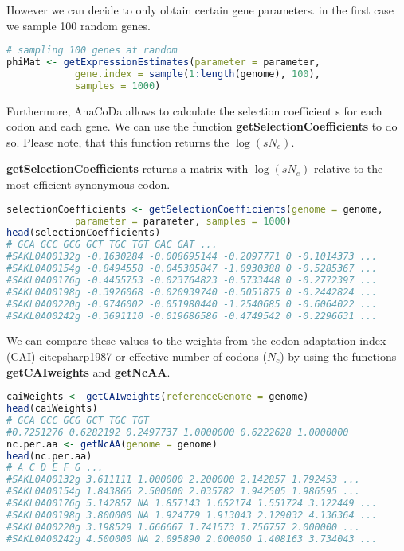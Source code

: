 However we can decide to only obtain certain gene parameters. in the first case we sample 100 random genes.

\begin{lstlisting}[language=R]
# sampling 100 genes at random
phiMat <- getExpressionEstimates(parameter = parameter,
			gene.index = sample(1:length(genome), 100),
			samples = 1000)
\end{lstlisting}

Furthermore, AnaCoDa allows to calculate the selection coefficient s for each codon and each gene. We can
use the function \textbf{getSelectionCoefficients} to do so. Please note, that this function returns the $\log(sN_e)$.

\textbf{getSelectionCoefficients} returns a matrix with $\log(sN_e)$ relative to the most efficient synonymous codon.

\begin{lstlisting}[language=R]
selectionCoefficients <- getSelectionCoefficients(genome = genome,
			parameter = parameter, samples = 1000)
head(selectionCoefficients)
# GCA GCC GCG GCT TGC TGT GAC GAT ...
#SAKL0A00132g -0.1630284 -0.008695144 -0.2097771 0 -0.1014373 ...
#SAKL0A00154g -0.8494558 -0.045305847 -1.0930388 0 -0.5285367 ...
#SAKL0A00176g -0.4455753 -0.023764823 -0.5733448 0 -0.2772397 ...
#SAKL0A00198g -0.3926068 -0.020939740 -0.5051875 0 -0.2442824 ...
#SAKL0A00220g -0.9746002 -0.051980440 -1.2540685 0 -0.6064022 ...
#SAKL0A00242g -0.3691110 -0.019686586 -0.4749542 0 -0.2296631 ...
\end{lstlisting}

We can compare these values to the weights from the codon adaptation index (CAI) citep{sharp1987} or
effective number of codons ($N_c$) \citep{Wright1990} by using the functions \textbf{getCAIweights} and \textbf{getNcAA}.

\begin{lstlisting}[language=R]
caiWeights <- getCAIweights(referenceGenome = genome)
head(caiWeights)
# GCA GCC GCG GCT TGC TGT
#0.7251276 0.6282192 0.2497737 1.0000000 0.6222628 1.0000000
nc.per.aa <- getNcAA(genome = genome)
head(nc.per.aa)
# A C D E F G ...
#SAKL0A00132g 3.611111 1.000000 2.200000 2.142857 1.792453 ...
#SAKL0A00154g 1.843866 2.500000 2.035782 1.942505 1.986595 ...
#SAKL0A00176g 5.142857 NA 1.857143 1.652174 1.551724 3.122449 ...
#SAKL0A00198g 3.800000 NA 1.924779 1.913043 2.129032 4.136364 ...
#SAKL0A00220g 3.198529 1.666667 1.741573 1.756757 2.000000 ...
#SAKL0A00242g 4.500000 NA 2.095890 2.000000 1.408163 3.734043 ...
\end{lstlisting}


